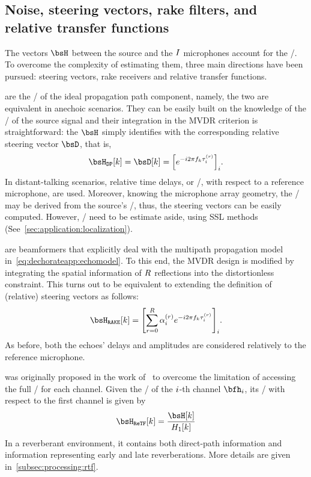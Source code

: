 \subsection{Noise, steering vectors, rake filters, and relative transfer functions}

The vectors $\FLTS$ between the source and the $I$ microphones account for the \RTFs/.
To overcome the complexity of estimating them, three main directions have been pursued: steering vectors, rake receivers and relative transfer functions.

 are the \RTFs/ of the ideal propagation path component, namely, the two are equivalent in anechoic scenarios.
They can be easily built on the knowledge of the \TOAs/ of the source signal and their integration in the \ac{MVDR} criterion is straightforward:
the $\FLTS$ simply identifies with the corresponding relative steering vector $\bsD$, that is,
\begin{equation}
    \FLTS_{\mathtt{DP}}[k] = \bsD[k] = \kbracket{ \cste^{-\csti 2 \pi f_k \tau_i^{(r)}} }_i
    .
\end{equation}
In distant-talking scenarios, relative time delays, or \TDOAs/, with respect to a reference microphone, are used.
Moreover, knowing the microphone array geometry, the \TDOAs/ may be derived from the source's \DOA/, thus, the steering vectors can be easily computed. However, \DOAs/ need to be estimate aside, using \acf{SSL} methods (See~\cref{sec:application:localization}).

 are beamformers that explicitly deal with the multipath propagation model in~\cref{eq:dechorateapp:echomodel}.
To this end, the \ac{MVDR} design is modified by integrating the spatial information of $R$ reflections into the distortionless constraint.
This turns out to be equivalent to extending the definition of (relative) steering vectors as follows:
\begin{equation}
    \FLTS_{\mathtt{RAKE}}[k] = \kbracket{ \sum_{\idxEch=0}^{\numEchs} \alpha_{\idxMic}^{(r)} \cste^{-\csti 2 \pi f_k \tau_i^{(r)}} }_i
    .
\end{equation}
As before, both the echoes' delays and amplitudes are considered relatively to the reference microphone.

 was originally proposed in the work of~ to overcome the limitation of accessing the full \RTF/ for each channel.
Given the \RTF/ of the $i$-th channel $\bfh_\idxMic$, its \ReTF/ with respect to the first channel is given by
\begin{equation}
    \FLTS_{\mathtt{ReTF}}[k] = \frac{\FLTS[k]}{H_1[k]}
\end{equation}
In a reverberant environment, it contains both direct-path information and information representing early and late reverberations.
More details are given in~\cref{subsec:processing:rtf}.

